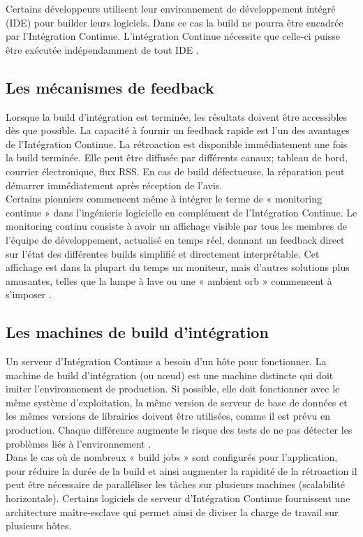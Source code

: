     Certains développeurs utilisent leur environnement de développement intégré (IDE) pour builder leurs logiciels. Dans ce cas la build ne pourra être encadrée par l’Intégration Continue. L’intégration Continue nécessite que celle-ci puisse être exécutée indépendamment de tout IDE \cite{Duv07}.

    \subsection{Les mécanismes de feedback}
    Lorsque la build d'intégration est terminée, les résultats doivent être accessibles dès que possible. La capacité à fournir un feedback rapide est l'un des avantages de l’Intégration Continue. La rétroaction est disponible immédiatement une fois la build terminée. Elle peut être diffusée par différents canaux; tableau de bord, courrier électronique, flux RSS. En cas de build défectueuse, la réparation peut démarrer immédiatement après réception de l'avis.\\

    Certains pionniers commencent même à intégrer le terme de « monitoring continue » dans l’ingénierie logicielle en complément de l’Intégration Continue. Le monitoring continu consiste à avoir un affichage visible par tous les membres de l’équipe de développement, actualisé en temps réel, donnant un feedback direct sur l’état des différentes builds simplifié et directement interprétable. Cet affichage est dans la plupart du temps un moniteur, mais d’autres solutions plus amusantes, telles que la lampe à lave ou une « ambient orb » commencent à s’imposer \cite{Swa04}.

    \subsection{Les machines de build d’intégration}
    Un serveur d’Intégration Continue a besoin d'un hôte pour fonctionner. La machine de build d’intégration (ou nœud) est une machine distincte qui doit imiter l'environnement de production. Si possible, elle doit fonctionner avec le même système d'exploitation, la même version de serveur de base de données et les mêmes versions de librairies doivent être utilisées, comme il est prévu en production. Chaque différence augmente le risque des tests de ne pas détecter les problèmes liés à l’environnement \cite{Fow06}.\\

    Dans le cas où de nombreux « build jobs » sont configurés pour l’application, pour réduire la durée de la build et ainsi augmenter la rapidité de la rétroaction il peut être nécessaire de paralléliser les tâches sur plusieurs machines (scalabilité horizontale). Certains logiciels de serveur d’Intégration Continue fournissent une architecture maître-esclave qui permet ainsi de diviser la charge de travail sur plusieurs hôtes.\\


